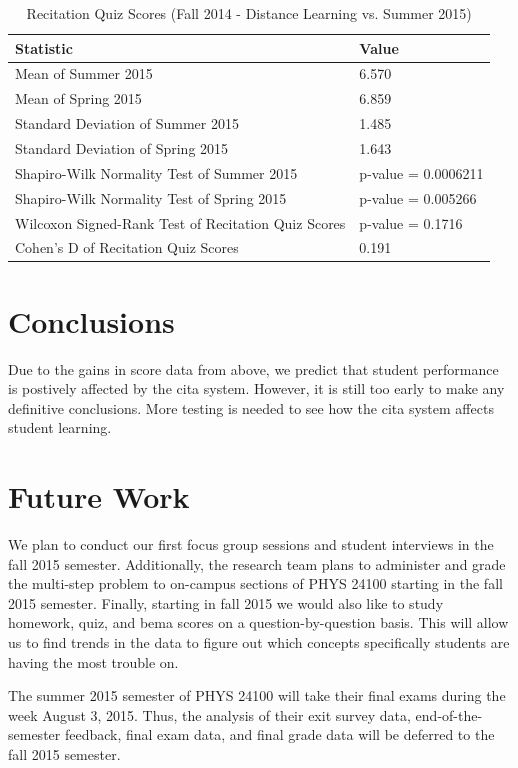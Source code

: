 \begin{small}
\begin{table}
  \centering
  \begin{tabular}{|l|l|}
    \hline
    \textbf{Statistic} & \textbf{Value} \\
	\hline
	Mean of Summer 2015 & 6.570 \\
	\hline
	Mean of Spring 2015 & 6.859 \\
	\hline
	Standard Deviation of Summer 2015 & 1.485 \\
	\hline
	Standard Deviation of Spring 2015 & 1.643 \\
	\hline
	Shapiro-Wilk Normality Test of Summer 2015 & p-value = 0.0006211 \\
	\hline
	Shapiro-Wilk Normality Test of Spring 2015 & p-value = 0.005266 \\
	\hline
	Wilcoxon Signed-Rank Test of Recitation Quiz Scores & p-value = 0.1716 \\
	\hline
	Cohen's D of Recitation Quiz Scores & 0.191 \\
	\hline
  \end{tabular}
	\caption[Recitation Quiz Scores (Fall 2014 - Distance Learning vs. Summer 2015)]{Recitation Quiz Scores (Fall 2014 - Distance Learning vs. Summer 2015)}
  \label{tab:rqf14dSu15}
\end{table}
\end{small}

\section{Conclusions}

Due to the gains in score data from above, we predict that student performance is postively affected by the \gls{cita} system. However, it is still too early to make any definitive conclusions. More testing is needed to see how the \gls{cita} system affects student learning.

\section{Future Work}

We plan to conduct our first focus group sessions and student interviews in the fall 2015 semester. Additionally, the research team plans to administer and grade the multi-step problem to on-campus sections of PHYS 24100 starting in the fall 2015 semester. Finally, starting in fall 2015 we would also like to study homework, quiz, and \gls{bema} scores on a question-by-question basis. This will allow us to find trends in the data to figure out which concepts specifically students are having the most trouble on.

The summer 2015 semester of PHYS 24100 will take their final exams during the week August 3, 2015. Thus, the analysis of their exit survey data, end-of-the-semester feedback, final exam data, and final grade data will be deferred to the fall 2015 semester.
